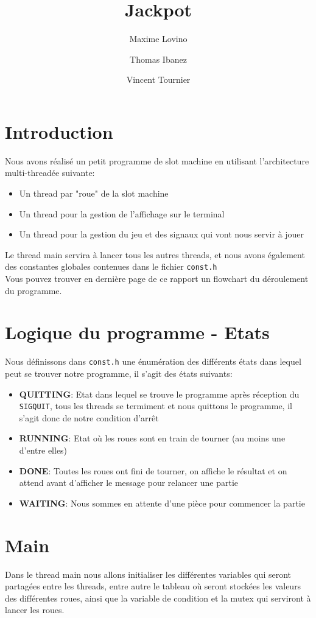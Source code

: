\documentclass[a4paper]{article}
\title{Jackpot}
\author{Maxime Lovino \and Thomas Ibanez \and Vincent Tournier}
\begin{document}
\maketitle
\newpage
\section{Introduction}
Nous avons réalisé un petit programme de slot machine en utilisant l'architecture multi-threadée suivante:
\begin{itemize}
	\item Un thread par "roue" de la slot machine
	\item Un thread pour la gestion de l'affichage sur le terminal
	\item Un thread pour la gestion du jeu et des signaux qui vont nous servir à jouer
\end{itemize}
Le thread main servira à lancer tous les autres threads, et nous avons également des constantes globales contenues dans le fichier \verb+const.h+ \\

Vous pouvez trouver en dernière page de ce rapport un flowchart du déroulement du programme.
\section{Logique du programme - Etats}
Nous définissons dans \verb+const.h+ une énumération des différents états dans lequel peut se trouver notre programme, il s'agit des états suivants: \\
\begin{itemize}
	\item \textbf{QUITTING}: Etat dans lequel se trouve le programme après réception du \verb+SIGQUIT+, tous les threads se termiment et nous quittons le programme, il s'agit donc de notre condition d'arrêt
	\item \textbf{RUNNING}: Etat où les roues sont en train de tourner (au moins une d'entre elles)
	\item \textbf{DONE}: Toutes les roues ont fini de tourner, on affiche le résultat et on attend avant d'afficher le message pour relancer une partie
	\item \textbf{WAITING}: Nous sommes en attente d'une pièce pour commencer la partie
\end{itemize}
\section{Main}
Dans le thread main nous allons initialiser les différentes variables qui seront partagées entre les threads, entre autre le tableau où seront stockées les valeurs des différentes roues, ainsi que la variable de condition et la mutex qui serviront à lancer les roues.\\
\end{document}
